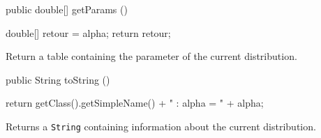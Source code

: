 \begin{code}

   public double[] getParams ()\begin{hide} {
      double[] retour = {alpha};
      return retour;
   }\end{hide}
\end{code}
\begin{tabb}
   Return a table containing the parameter of the current distribution.
\end{tabb}
\begin{hide}\begin{code}

   public String toString ()\begin{hide} {
      return getClass().getSimpleName() + " : alpha = " + alpha;
   }\end{hide}
\end{code}
\begin{tabb}
   Returns a \texttt{String} containing information about the current distribution.
\end{tabb}\end{hide}
\begin{code}\begin{hide}
}\end{hide}
\end{code}
